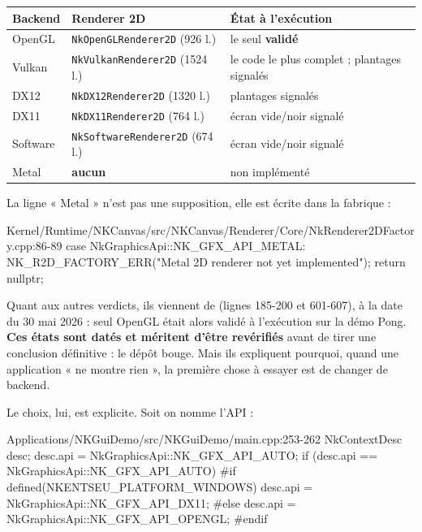 \begin{center}
\begin{tabular}{@{}lll@{}}
\toprule
\textbf{Backend} & \textbf{Renderer 2D} & \textbf{État à l'exécution} \\
\midrule
OpenGL   & \texttt{NkOpenGLRenderer2D} (926 l.)  & le seul \textbf{validé} \\
Vulkan   & \texttt{NkVulkanRenderer2D} (1524 l.) & le code le plus complet ; plantages signalés \\
DX12     & \texttt{NkDX12Renderer2D} (1320 l.)   & plantages signalés \\
DX11     & \texttt{NkDX11Renderer2D} (764 l.)    & écran vide/noir signalé \\
Software & \texttt{NkSoftwareRenderer2D} (674 l.) & écran vide/noir signalé \\
Metal    & \textbf{aucun}                        & non implémenté \\
\bottomrule
\end{tabular}
\end{center}

La ligne « Metal » n'est pas une supposition, elle est écrite dans la fabrique :

\begin{nkcode}{Kernel/Runtime/NKCanvas/src/NKCanvas/Renderer/Core/NkRenderer2DFactory.cpp:86-89}
case NkGraphicsApi::NK_GFX_API_METAL:
    NK_R2D_FACTORY_ERR("Metal 2D renderer not yet implemented");
    return nullptr;
\end{nkcode}

Quant aux autres verdicts, ils viennent de
 (lignes 185-200 et 601-607), à la
date du 30 mai 2026 : seul OpenGL était alors validé à l'exécution sur la démo
Pong. \textbf{Ces états sont datés et méritent d'être revérifiés} avant de tirer
une conclusion définitive : le dépôt bouge. Mais ils expliquent pourquoi, quand
une application « ne montre rien », la première chose à essayer est de changer de
backend.

Le choix, lui, est explicite. Soit on nomme l'API :

\begin{nkcode}{Applications/NKGuiDemo/src/NKGuiDemo/main.cpp:253-262}
    NkContextDesc desc;
    desc.api = NkGraphicsApi::NK_GFX_API_AUTO;
    if (desc.api == NkGraphicsApi::NK_GFX_API_AUTO) {
#if defined(NKENTSEU_PLATFORM_WINDOWS)
        desc.api = NkGraphicsApi::NK_GFX_API_DX11;
#else
        desc.api = NkGraphicsApi::NK_GFX_API_OPENGL;
#endif
    }
\end{nkcode}

